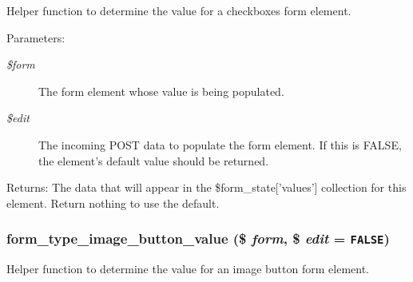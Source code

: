 Helper function to determine the value for a checkboxes form element.

\begin{Desc}
\item[Parameters:]
\begin{description}
\item[{\em \$form}]The form element whose value is being populated. \item[{\em \$edit}]The incoming POST data to populate the form element. If this is FALSE, the element's default value should be returned. \end{description}
\end{Desc}
\begin{Desc}
\item[Returns:]The data that will appear in the \$form\_\-state\mbox{[}'values'\mbox{]} collection for this element. Return nothing to use the default. \end{Desc}
\hypertarget{group__form__api_ga031aa7b832710f2a21d3b2351ed0fc6}{
\subsubsection[{form\_\-type\_\-image\_\-button\_\-value}]{\setlength{\rightskip}{0pt plus 5cm}form\_\-type\_\-image\_\-button\_\-value (\$ {\em form}, \/  \$ {\em edit} = {\tt FALSE})}}
\label{group__form__api_ga031aa7b832710f2a21d3b2351ed0fc6}


Helper function to determine the value for an image button form element.


